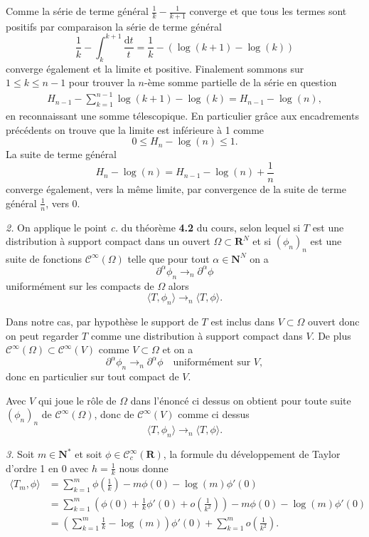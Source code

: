 \documentclass[12pt]{article}
\newcommand{\R}{\mathbf{R}}
\newcommand{\N}{\mathbf{N}}
\newcommand{\de}{\mathrm{d}}
\begin{document}
Comme la série de terme général $\frac{1}{k}-\frac{1}{k+1}$ converge et que tous les termes sont positifs par comparaison la série de terme général 
\[
        \frac{1}{k} - \int_{k}^{k+1} \frac{\de t}{t} = \frac{1}{k} - (\log(k+1) - \log(k))
\] converge également et la limite et positive. Finalement sommons sur $1 \le k \le n-1$ pour trouver la $n$-ème somme partielle de la série en question 
\begin{align*}
        H_{n-1} - \sum_{k=1}^{n-1} \log(k+1) - \log(k) = H_{n-1} - \log(n) 
,\end{align*}
en reconnaissant une somme télescopique. En particulier grâce aux encadrements précédents on trouve que la limite est inférieure à 1 comme \[
        0 \le H_{n} - \log(n) \le 1
.\]
La suite de terme général \[
        H_{n} - \log(n) = H_{n-1} - \log(n) + \frac{1}{n}
\] converge également, vers la même limite, par convergence de la suite de terme général $\frac{1}{n}$, vers 0.

\bigskip

\textit{2.} On applique le point \textit{c.} du théorème \textbf{4.2} du cours, selon lequel si $T$ est une distribution à support compact dans un ouvert $\Omega \subset \R^{N}$ et si $(\phi_{n})_{n}$ est une suite de fonctions $\mathcal{C}^{\infty}(\Omega)$ telle que pour tout $\alpha \in \N^{N}$ on a \[
\partial^{\alpha}\phi_{n} \to_{n} \partial^{\alpha}\phi
\] uniformément sur les compacts de $\Omega$ alors  \[
\langle T, \phi_{n} \rangle \to_{n} \langle T, \phi \rangle
.\] 

Dans notre cas, par hypothèse le support de $T$ est inclus dans $V \subset \Omega$ ouvert donc on peut regarder $T$ comme une distribution à support compact dans $V$. De plus $\mathcal{C}^{\infty}(\Omega) \subset \mathcal{C}^{\infty}(V)$ comme $V \subset \Omega$ et on a  \[
\partial^{\alpha}\phi_{n} \to_{n} \partial^{\alpha}\phi \quad \text{uniformément sur } V
,\] donc en particulier sur tout compact de $V$. 

Avec $V$ qui joue le rôle de $\Omega$ dans l'énoncé ci dessus on obtient pour toute suite $(\phi_{n})_{n}$ de $\mathcal{C}^{\infty}(\Omega)$, donc de $\mathcal{C}^{\infty}(V)$ comme ci dessus \[
        \langle T, \phi_{n} \rangle \to_{n} \langle T, \phi \rangle
.\]  

\bigskip

\textit{3.} Soit $m \in \N^{*}$ et soit $\phi \in \mathcal{C}^{\infty}_{c}(\R)$, la formule du développement de Taylor d'ordre 1 en 0 avec $h = \frac{1}{k}$ nous donne
\begin{align*}
        \langle T_{m}, \phi \rangle &= \sum_{k=1}^{m} \phi(\frac{1}{k}) - m\phi(0) - \log(m)\phi'(0) \\
                                    &= \sum_{k=1}^{m}(\phi(0) + \frac{1}{k}\phi'(0) + o(\frac{1}{k^{2}})) - m\phi(0) - \log(m)\phi'(0) \\
                                    &= (\sum_{k=1}^{m}\frac{1}{k} - \log(m))\phi'(0) + \sum_{k=1}^{m} o(\frac{1}{k^{2}}) 
.\end{align*}
\end{document}
